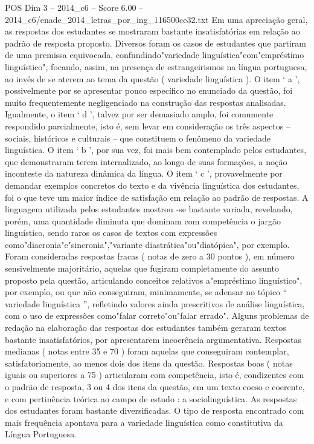 \begin{textsample}{POS Dim 3 – 2014\_c6 – Score 6.00 – 2014\_c6/enade\_2014\_letras\_por\_ing\_116500ce32.txt}
Em uma apreciação geral, as respostas dos estudantes se mostraram bastante insatisfatórias em relação ao padrão de resposta proposto.
Diversos foram os casos de estudantes que partiram de uma premissa equivocada, confundindo"variedade linguística"com"empréstimo linguístico", focando, assim, na presença de estrangeirismos na língua portuguesa, ao invés de se aterem ao tema da questão ( variedade linguística ).
O item ‘ a ’, possivelmente por se apresentar pouco específico no enunciado da questão, foi muito frequentemente negligenciado na construção das respostas analisadas.
Igualmente, o item ‘ d ’, talvez por ser demasiado amplo, foi comumente respondido parcialmente, isto é, sem levar em consideração os três aspectos – sociais, históricos e culturais – que constituem o fenômeno da variedade linguística.
O item ‘ b ’, por sua vez, foi mais bem contemplado pelos estudantes, que demonstraram terem internalizado, ao longo de suas formações, a noção inconteste da natureza dinâmica da língua.
O item ‘ c ’, provavelmente por demandar exemplos concretos do texto e da vivência linguística dos estudantes, foi o que teve um maior índice de satisfação em relação ao padrão de respostas.
A linguagem utilizada pelos estudantes mostrou -se bastante variada, revelando, porém, uma quantidade diminuta que dominam com competência o jargão linguístico, sendo raros os casos de textos com expressões como"diacronia"e"sincronia","variante diastrática"ou"diatópica", por exemplo.
Foram consideradas respostas fracas ( notas de zero a 30 pontos ), em número sensivelmente majoritário, aquelas que fugiram completamente do assunto proposto pela questão, articulando conceitos relativos a"empréstimo linguístico", por exemplo, ou que não conseguiram, minimamente, se adensar no tópico “ variedade linguística ”, refletindo valores ainda prescritivos de análise linguística, com o uso de expressões como"falar correto"ou"falar errado".
Alguns problemas de redação na elaboração das respostas dos estudantes também geraram textos bastante insatisfatórios, por apresentarem incoerência argumentativa.
Respostas medianas ( notas entre 35 e 70 ) foram aquelas que conseguiram contemplar, satisfatoriamente, ao menos dois dos itens da questão.
Respostas boas ( notas iguais ou superiores a 75 ) articularam com competência, isto é, condizentes com o padrão de resposta, 3 ou 4 dos itens da questão, em um texto coeso e coerente, e com pertinência teórica ao campo de estudo : a sociolinguística.
As respostas dos estudantes foram bastante diversificadas.
O tipo de resposta encontrado com mais frequência apontava para a variedade linguística como constitutiva da Língua Portuguesa.

\end{textsample}
